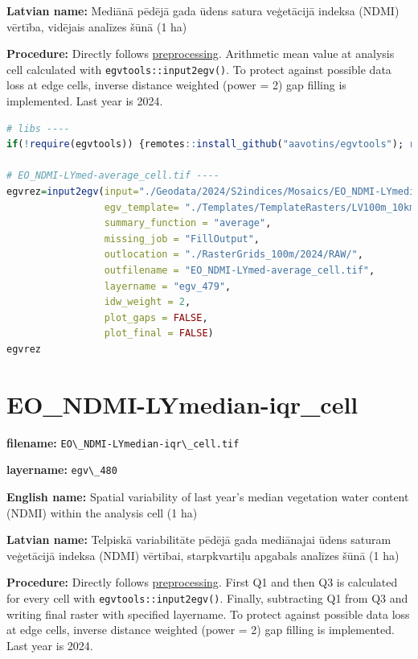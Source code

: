 \documentclass[
]{book}
\newcommand{\passthrough}[1]{#1}
\begin{document}
\textbf{Latvian name:} Mediānā pēdējā gada ūdens satura veģetācijā indeksa (NDMI) vērtība, vidējais analīzes šūnā (1 ha)

\textbf{Procedure:} Directly follows \hyperref[Ch04.13]{preprocessing}. Arithmetic mean value at analysis cell
calculated with \passthrough{\lstinline!egvtools::input2egv()!}. To protect against possible data loss at edge cells,
inverse distance weighted (power = 2) gap filling is implemented. Last year is 2024.

\begin{lstlisting}[language=R]
# libs ----
if(!require(egvtools)) {remotes::install_github("aavotins/egvtools"); require(egvtools)}

# EO_NDMI-LYmed-average_cell.tif ----
egvrez=input2egv(input="./Geodata/2024/S2indices/Mosaics/EO_NDMI-LYmedian.tif",
                 egv_template= "./Templates/TemplateRasters/LV100m_10km.tif",
                 summary_function = "average",
                 missing_job = "FillOutput",
                 outlocation = "./RasterGrids_100m/2024/RAW/",
                 outfilename = "EO_NDMI-LYmed-average_cell.tif",
                 layername = "egv_479",
                 idw_weight = 2,
                 plot_gaps = FALSE,
                 plot_final = FALSE)
egvrez
\end{lstlisting}

\section{EO\_NDMI-LYmedian-iqr\_cell}\label{ch06.480}

\textbf{filename:} \passthrough{\lstinline!EO\_NDMI-LYmedian-iqr\_cell.tif!}

\textbf{layername:} \passthrough{\lstinline!egv\_480!}

\textbf{English name:} Spatial variability of last year's median vegetation water content (NDMI) within the analysis cell (1 ha)

\textbf{Latvian name:} Telpiskā variabilitāte pēdējā gada mediānajai ūdens saturam veģetācijā indeksa (NDMI) vērtībai, starpkvartiļu apgabals analīzes šūnā (1 ha)

\textbf{Procedure:} Directly follows \hyperref[Ch04.13]{preprocessing}. First Q1 and then Q3
is calculated for every cell with \passthrough{\lstinline!egvtools::input2egv()!}. Finally, subtracting
Q1 from Q3 and writing final raster with specified layername. To protect against possible data loss at edge cells,
inverse distance weighted (power = 2) gap filling is implemented. Last year is 2024.
\end{document}
